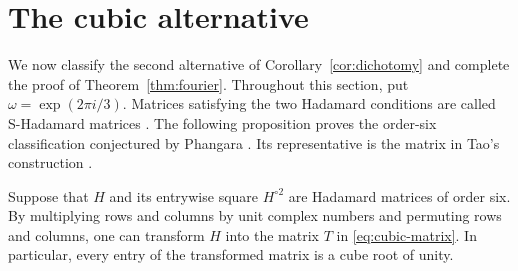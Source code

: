 \section{The cubic alternative}\label{sec:cubic}

We now classify the second alternative of Corollary~\ref{cor:dichotomy}
and complete the proof of Theorem~\ref{thm:fourier}.
Throughout this section, put $\omega=\exp(2\pi i/3)$.
Matrices satisfying the two Hadamard conditions are called S-Hadamard
matrices \cite[Definition~2.1]{Lisonek2019}. The following proposition
proves the order-six classification conjectured by Phangara
\cite[Conjecture~3.1.6]{Phangara2026}. Its representative is the matrix
in Tao's construction \cite[p.~254]{Tao2004}.

\begin{proposition}
\label{prop:cubic-classification}
Suppose that $H$ and its entrywise square $H^{\circ2}$ are Hadamard
matrices of order six. By multiplying rows and columns by unit complex
numbers and permuting rows and columns, one can transform $H$ into the
matrix $T$ in \eqref{eq:cubic-matrix}.
In particular, every entry of the transformed matrix is a cube root of
unity.
\end{proposition}

